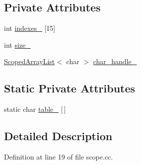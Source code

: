 \subsection*{Private Attributes}
\begin{DoxyCompactItemize}
\item 
int \hyperlink{classmocha_1_1_renamer_ab5cd8f42f56a5137e51531fa6ea885eb}{indexes\_\-} \mbox{[}15\mbox{]}
\item 
int \hyperlink{classmocha_1_1_renamer_a9ce518fa1f650ad5b9b8414cf1561184}{size\_\-}
\item 
\hyperlink{classmocha_1_1_scoped_array_list}{ScopedArrayList}$<$ char $>$ \hyperlink{classmocha_1_1_renamer_a0394aacdf52da2d8c4df274e18e598bc}{char\_\-handle\_\-}
\end{DoxyCompactItemize}
\subsection*{Static Private Attributes}
\begin{DoxyCompactItemize}
\item 
static char \hyperlink{classmocha_1_1_renamer_a1de2b2e14de4fe8bbf4335ba5629eee6}{table\_\-} \mbox{[}$\,$\mbox{]}
\end{DoxyCompactItemize}


\subsection{Detailed Description}


Definition at line 19 of file scope.cc.



